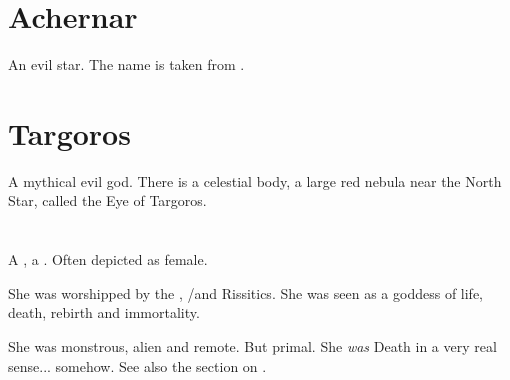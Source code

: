 \section{Achernar}
An evil star. 
The name is taken from . 















\section{Targoros}
A mythical evil god. There is a celestial body, a large red nebula near the North Star, called the Eye of Targoros. 















\section{\XzaiShanns}














\subsection{\KhothSell}
\index{\KhothSell}
A \firstgendragon, a \xs. 
Often depicted as female.

She was worshipped by the \dragons, \Ortaicans/\rethyaxes and Rissitics.
She was seen as a goddess of life, death, rebirth and immortality. 


She was monstrous, alien and remote. 
But primal. 
She \emph{was} Death in a very real sense... somehow.
See also the section on .

